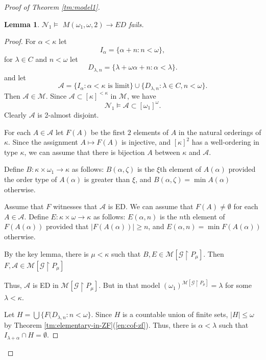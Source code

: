 \documentclass[a4paper,10pt,reqno]{amsart}
\numberwithin{equation}{section}
\newtheorem{lemma}[theorem]{Lemma}
\theoremstyle{definition}
\theoremstyle{remark}
\newcommand{\mc}[1]{\mathcal{#1}}
\newcommand{\empt}{\emptyset}
\newcommand{\subs}{\subset}
\begin{document}
\begin{proof}[Proof of Theorem \ref{tm:model1}]
    
\begin{lemma}\label{lm:m1ed}
    $\mc N_1\models $ $M({\omega}_1,{\omega},2)\to ED$ fails.
    \end{lemma}
    

    \begin{proof}
        For ${\alpha}<{\kappa}$ let $$I_{\alpha}=\{{\alpha}+n:n<{\omega}\},$$
for ${\lambda}\in C$ and $n<{\omega}$ let 
\begin{displaymath}
D_{{\lambda},n}=\{{\lambda}+{\omega}{\alpha}+n: {\alpha}<{\lambda}\}.
\end{displaymath}
and let 
\begin{displaymath}
\mc A=\{I_{\alpha}:{\alpha}<{\kappa}\text{ is limit}\}\cup\{D_{{\lambda},n}:{\lambda}\in C,n<{\omega}\}.
\end{displaymath}
Then $\mc A\in \mc M$. Since $\mc A\subs {[{\kappa}]}^{<{\kappa}}$ in $\mc M$,
we have  $$\mc N_1\models  \mc A\subs {[{\omega}_1]}^{{\omega}}.$$ 
Clearly $\mc A$ is 2-almost disjoint.


For each $A\in \mc A$ let $F(A)$ be the first $2$ elements of $A$ in the natural orderings 
of ${\kappa}$. Since the assignment  $A\mapsto F(A)$ is injective, and 
${[{\kappa}]}^{2}$ has a well-ordering in type ${\kappa}$, 
we can assume that there is bijection  $A$ 
between ${\kappa}$ and $\mc A$.

Define $B:{\kappa}\times {\omega}_1\to {\kappa}$ as follows:
$B({\alpha},{\zeta})$ is the ${\xi}$th element of $A({\alpha})$ provided the 
order type of $A({\alpha})$ is greater than ${\xi}$, and 
$B({\alpha},{\zeta})=\min A({\alpha})$ otherwise. 

Assume that $F$ witnesses that  $\mc A$ is ED.
We can assume that $F(A)\ne \empt$ for each $A\in \mc A$.
Define $E:{\kappa}\times {\omega}\to {\kappa}$ as follows: 
$E({\alpha},n)$ is the $n$th element of $F(A({\alpha}))$ provided that
 $|F(A({\alpha}))|\ge n$, and 
$E({\alpha},n)=\min F(A({\alpha}))$ otherwise. 



By the key lemma, there is ${\mu}<{\kappa}$ such that 
$B,E\in \mc M[\mc G\restriction P_{\mu}]$.
Then $F,\mc A\in \mc M[\mc G\restriction P_{\mu}]$



Thus, $\mc A$ is ED in $\mc M[\mc G\restriction P_{\mu}]$.
But in that model $({\omega}_1)^{\mc M[\mc G\restriction P_{\mu}]}={\lambda}$
for some ${\lambda}<{\kappa}$.

Let $H=\bigcup\{F(D_{{\lambda},n}:n<{\omega}\}$.
Since $H$ is a countable union of finite sets, $|H|\le {\omega}$ by Theorem 
\ref{tm:elementary-in-ZF}(\ref{en:cof-zf}).
Thus, there is ${\alpha}<{\lambda}$ such that $I_{{\lambda}+{\alpha}}\cap H=\empt$.


\end{proof}
\end{proof}
\end{document}
